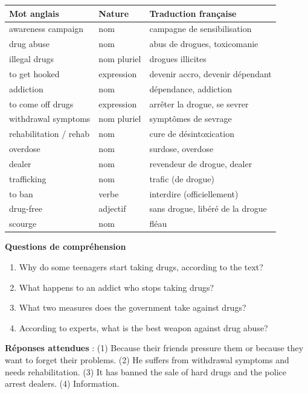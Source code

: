 \documentclass[11pt]{article}
\begin{document}
\begin{center}
\begin{tabularx}{\linewidth}{|l|l|X|}
\hline
\rowcolor{popblueL} \textbf{Mot anglais} & \textbf{Nature} & \textbf{Traduction française} \\
\hline
awareness campaign & nom & campagne de sensibilisation \\
\hline
drug abuse & nom & abus de drogues, toxicomanie \\
\hline
illegal drugs & nom pluriel & drogues illicites \\
\hline
to get hooked & expression & devenir accro, devenir dépendant \\
\hline
addiction & nom & dépendance, addiction \\
\hline
to come off drugs & expression & arrêter la drogue, se sevrer \\
\hline
withdrawal symptoms & nom pluriel & symptômes de sevrage \\
\hline
rehabilitation / rehab & nom & cure de désintoxication \\
\hline
overdose & nom & surdose, overdose \\
\hline
dealer & nom & revendeur de drogue, dealer \\
\hline
trafficking & nom & trafic (de drogue) \\
\hline
to ban & verbe & interdire (officiellement) \\
\hline
drug-free & adjectif & sans drogue, libéré de la drogue \\
\hline
scourge & nom & fléau \\
\hline
\end{tabularx}
\end{center}

\textbf{Questions de compréhension}

\begin{enumerate}
\item Why do some teenagers start taking drugs, according to the text?
\item What happens to an addict who stops taking drugs?
\item What two measures does the government take against drugs?
\item According to experts, what is the best weapon against drug abuse?
\end{enumerate}

\textbf{Réponses attendues} : (1) Because their friends pressure them or because they want to forget their problems. (2) He suffers from withdrawal symptoms and needs rehabilitation. (3) It has banned the sale of hard drugs and the police arrest dealers. (4) Information.
\end{document}
